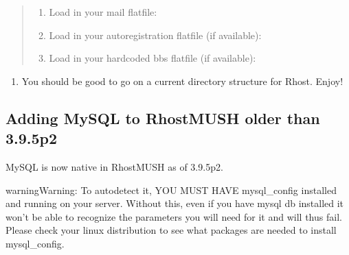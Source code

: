 \documentclass[letterpaper,10pt,english]{sphinxmanual}
\begin{document}
\begin{quote}
\begin{enumerate}
\end{enumerate}
\begin{enumerate}
%
\item {} 
\sphinxAtStartPar
Load in your mail flatfile:

\begin{sphinxVerbatim}[commandchars=\\\{\}]
\end{sphinxVerbatim}

\item {} 
\sphinxAtStartPar
Load in your autoregistration flatfile (if available):

\begin{sphinxVerbatim}[commandchars=\\\{\}]
\end{sphinxVerbatim}

\item {} 
\sphinxAtStartPar
Load in your hardcoded bbs flatfile (if available):

\begin{sphinxVerbatim}[commandchars=\\\{\}]
\end{sphinxVerbatim}

\end{enumerate}
\end{quote}
\begin{enumerate}
%
\setcounter{enumi}{8}
\item {} 
\sphinxAtStartPar
You should be good to go on a current directory structure for Rhost.  Enjoy!

\end{enumerate}


\subsection{Adding MySQL to RhostMUSH older than 3.9.5p2}
\label{\detokenize{upgrade:adding-mysql-to-rhostmush-older-than-3-9-5p2}}
\sphinxAtStartPar
MySQL is now native in RhostMUSH as of 3.9.5p2.

\begin{sphinxadmonition}{warning}{Warning:}
\sphinxAtStartPar
To autodetect it, YOU MUST HAVE mysql\_config installed and running on your server.  Without this, even if you have mysql db installed it won’t be able to recognize the parameters you will need for it and will thus fail.  Please check your linux distribution to see what packages are needed to install mysql\_config.
\end{sphinxadmonition}
\end{document}
